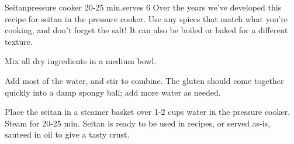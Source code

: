 \begin{recipe}{Seitan}{pressure cooker \hfill 20-25 min.}{\hfill serves 6}
  \freeform Over the years we've developed this recipe for seitan in the pressure cooker. Use any spices that match what you're cooking, and don't forget the salt! It can also be boiled or baked for a different texture.

Mix all dry ingredients in a medium bowl.

Add most of the water, and stir to combine. The gluten should come together quickly into a damp spongy ball; add more water as needed.

\newstep Place the seitan in a steamer basket over 1-2 cups water in the pressure cooker. Steam for 20-25 min.
\newstep Seitan is ready to be used in recipes, or served as-is, sauteed in oil to give a tasty crust.
\end{recipe}